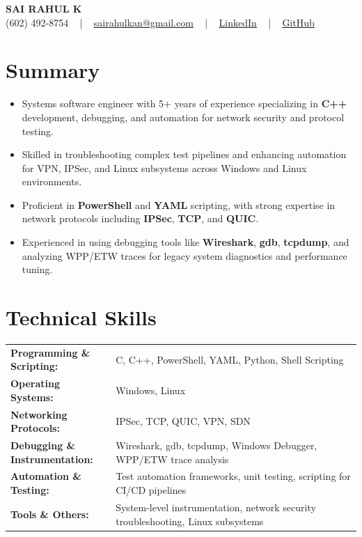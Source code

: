 \documentclass[letterpaper,11pt]{article}
\newcommand{\resumeItem}[1]{
  \item\footnotesize{
    {#1 \vspace{-2pt}}
  }
}
\newcommand{\resumeItemListStart}{\begin{itemize}[leftmargin=*]}
\newcommand{\resumeItemListEnd}{\end{itemize}\vspace{-5pt}}
\begin{document}
\begin{center}
    {\fontsize{14pt}{12pt}\selectfont \textbf{\MakeUppercase{Sai Rahul K}}}\\ \vspace{2pt}
    \fontsize{10pt}{12pt}\selectfont (602) 492-8754 ~ | ~ \href{mailto:sairahulkan@gmail.com}{sairahulkan@gmail.com} ~ | ~
    \href{https://www.linkedin.com/in/rq123/}{\color{blue}\underline{LinkedIn}} ~ | ~
    \href{https://github.com/kanrahuldo}{\color{blue}\underline{GitHub}}~
    \vspace{-8pt}
\end{center}

\section{Summary}
\fontsize{9pt}{10pt}\selectfont
\resumeItemListStart
    \resumeItem{Systems software engineer with 5+ years of experience specializing in \textbf{C++} development, debugging, and automation for network security and protocol testing.}
    \resumeItem{Skilled in troubleshooting complex test pipelines and enhancing automation for VPN, IPSec, and Linux subsystems across Windows and Linux environments.}
    \resumeItem{Proficient in \textbf{PowerShell} and \textbf{YAML} scripting, with strong expertise in network protocols including \textbf{IPSec}, \textbf{TCP}, and \textbf{QUIC}.}
    \resumeItem{Experienced in using debugging tools like \textbf{Wireshark}, \textbf{gdb}, \textbf{tcpdump}, and analyzing WPP/ETW traces for legacy system diagnostics and performance tuning.}
\resumeItemListEnd
\vspace{-6pt}

\section{Technical Skills}
        \vspace{-14pt}
        \begin{table}[h]
            \fontsize{9pt}{10pt}\selectfont
            \begin{tabular}{p{0.3\linewidth} p{0.7\linewidth}}
                \textbf{Programming \& Scripting:} & C, C++, PowerShell, YAML, Python, Shell Scripting \\
                \textbf{Operating Systems:} & Windows, Linux \\
                \textbf{Networking Protocols:} & IPSec, TCP, QUIC, VPN, SDN \\
                \textbf{Debugging \& Instrumentation:} & Wireshark, gdb, tcpdump, Windows Debugger, WPP/ETW trace analysis \\
                \textbf{Automation \& Testing:} & Test automation frameworks, unit testing, scripting for CI/CD pipelines \\
                \textbf{Tools \& Others:} & System-level instrumentation, network security troubleshooting, Linux subsystems \\
            \end{tabular}
        \end{table}
    \vspace{-15pt}
\end{document}
